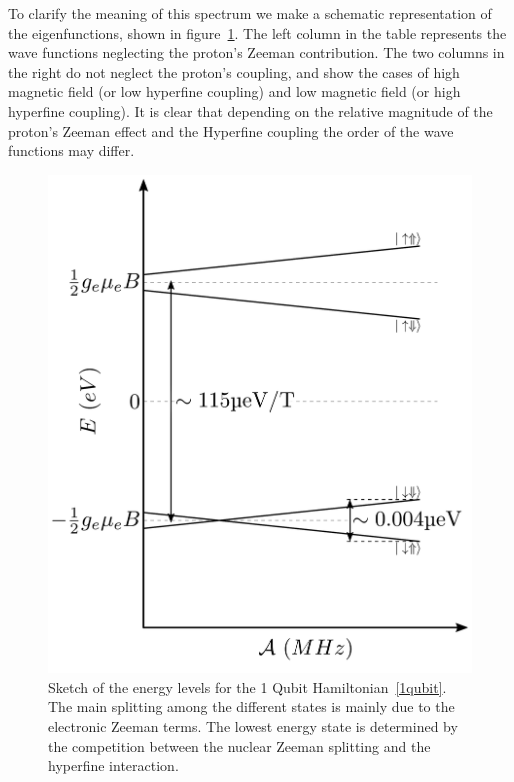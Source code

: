 To clarify the meaning of this spectrum we make a schematic representation of the eigenfunctions, shown in figure~\ref{levels1Qbit}. The left column in the table represents the wave functions neglecting the proton's Zeeman contribution. The two columns in the right do not neglect the proton's coupling, and show the cases of high magnetic field (or low hyperfine coupling) and low magnetic field (or high hyperfine coupling). It is clear that depending on the relative magnitude of the proton's Zeeman effect and the Hyperfine coupling the order of the wave functions may differ.
\begin{figure}[h!]
\centering
\includegraphics{chapter03/figures/levels1Qbit.pdf} %
\vspace{-5pt}
\caption{Sketch of the energy levels for the 1 Qubit Hamiltonian~\eqref{1qubit}. The main splitting among the different states is mainly due to the electronic Zeeman terms. The lowest energy state is determined by the competition between the nuclear Zeeman splitting and the hyperfine interaction.}
\label{levels1Qbit}
\end{figure}
